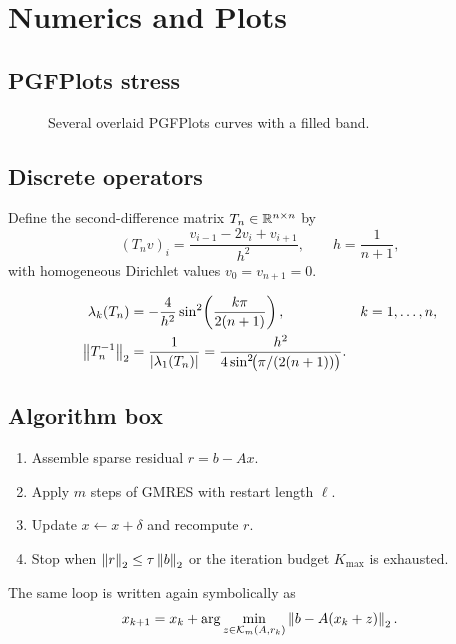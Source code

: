 \chapter{Numerics and Plots}
\label{ch:numerics}

\section{PGFPlots stress}
\begin{figure}[ht]
\centering

\caption{Several overlaid PGFPlots curves with a filled band.}
\label{fig:spectra}
\end{figure}

\section{Discrete operators}
Define the second-difference matrix $T_{n}\in\mathbb{R}^{n\times n}$ by
\begin{equation}
(T_{n}v)_{i}
=
\frac{v_{i-1}-2v_{i}+v_{i+1}}{h^{2}},
\qquad
h=\frac{1}{n+1},
\end{equation}
with homogeneous Dirichlet values $v_{0}=v_{n+1}=0$.

\begin{align}
\lambda_{k}(T_{n})
&=
-\frac{4}{h^{2}}\sin^{2}\!\left(\frac{k\pi}{2(n+1)}\right),
&
k&=1,\dots,n,
\\
\left\lVert T_{n}^{-1}\right\rVert_{2}
&=
\frac{1}{\left\lvert\lambda_{1}(T_{n})\right\rvert}
=
\frac{h^{2}}{4\sin^{2}\!\bigl(\pi/(2(n+1))\bigr)}.
\end{align}

\section{Algorithm box}
\begin{hipponote}[title={Pseudo-code payload}]
\begin{enumerate}[leftmargin=*,label=\arabic*.]
  \item Assemble sparse residual $r = b - Ax$.
  \item Apply $m$ steps of GMRES with restart length $\ell$.
  \item Update $x\leftarrow x+\delta$ and recompute $r$.
  \item Stop when $\left\lVert r\right\rVert_{2}\le\tau\left\lVert b\right\rVert_{2}$ or the iteration budget
        $K_{\max}$ is exhausted.
\end{enumerate}
The same loop is written again symbolically as
\[
x_{k+1}
=
x_{k}
+
\arg\min_{z\in\mathcal{K}_{m}(A,r_{k})}
\left\lVert b-A(x_{k}+z)\right\rVert_{2}.
\]
\end{hipponote}


